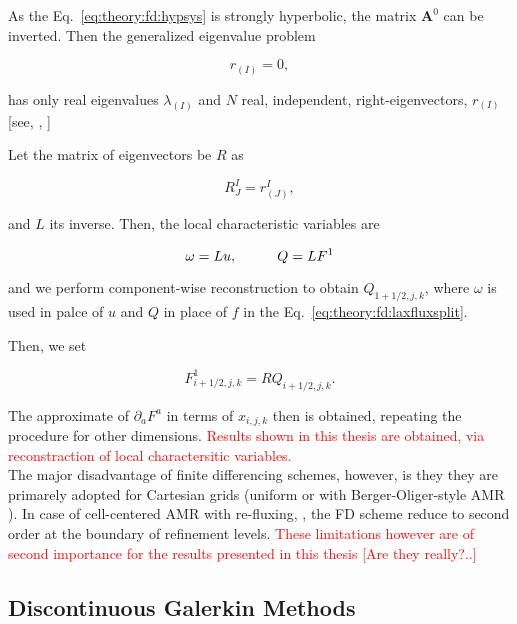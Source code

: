 As the Eq.~\eqref{eq:theory:fd:hypsys} is strongly hyperbolic, the matrix $\boldsymbol{A}^0$ can be inverted. 
Then the generalized eigenvalue problem 

\begin{equation}
[\boldsymbol{A}^1 - \lambda_{(1)}\boldsymbol{A}^0]r_{(I)} = 0,
\end{equation}

has only real eigenvalues $\lambda_{(I)}$ and $N$ real, independent, right-eigenvectors, $r_{(I)}$ [see, \eg, \citet{Anile:1990}]

Let the matrix of eigenvectors be $R$ as 

\begin{equation}
R_{J}^{I} = r^{I}_{(J)},
\end{equation}

and $L$ its inverse. 
Then, the local characteristic variables are 

\begin{equation}
\omega = Lu, \hspace{10mm} Q = LF^1
\end{equation}

and we perform component-wise reconstruction to obtain $Q_{1+1/2,j,k}$, where $\omega$ is used in palce of $u$ and $Q$ in place of $f$ in the Eq.~\eqref{eq:theory:fd:laxfluxsplit}. 

Then, we set

\begin{equation}
F^1_{i+1/2, j, k} = RQ_{i+1/2, j, k}.
\end{equation}

The approximate of $\partial_a F^a$ in terms of $x_{i,j,k}$ then is obtained, repeating the procedure for other dimensions. \textcolor{red}{
    Results shown in this thesis are obtained, via reconstraction of local charactersitic variables.
} \\

The major disadvantage of finite differencing schemes, however, is they they are primarely adopted for Cartesian grids (uniform or with Berger-Oliger-style \ac{AMR} \citep{Berger:1984}). 
In case of cell-centered \ac{AMR} with re-fluxing, \citep{Berger:1989}, the \ac{FD} scheme reduce to second order at the boundary of refinement levels. \textcolor{red}{
    These limitations however are of second importance for the results presented in this thesis [Are they really?..]
}



\subsection{Discontinuous Galerkin Methods}

